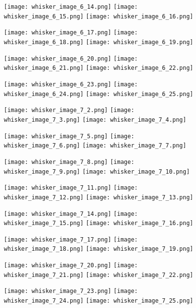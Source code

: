 \documentclass[12pt]{article}
\begin{document}
\begin{figure}
	\centerline{
		\texttt{[image: whisker\_image\_6\_14.png]}
		\texttt{[image: whisker\_image\_6\_15.png]}
		\texttt{[image: whisker\_image\_6\_16.png]}
	}
	\centerline{
		\texttt{[image: whisker\_image\_6\_17.png]}
		\texttt{[image: whisker\_image\_6\_18.png]}
		\texttt{[image: whisker\_image\_6\_19.png]}
	}
	\centerline{
		\texttt{[image: whisker\_image\_6\_20.png]}
		\texttt{[image: whisker\_image\_6\_21.png]}
		\texttt{[image: whisker\_image\_6\_22.png]}
	}
	\centerline{
		\texttt{[image: whisker\_image\_6\_23.png]}
		\texttt{[image: whisker\_image\_6\_24.png]}
		\texttt{[image: whisker\_image\_6\_25.png]}
	}
\end{figure}

\begin{figure}
	\centerline{
		\texttt{[image: whisker\_image\_7\_2.png]}
		\texttt{[image: whisker\_image\_7\_3.png]}
		\texttt{[image: whisker\_image\_7\_4.png]}
	}
	\centerline{
		\texttt{[image: whisker\_image\_7\_5.png]}
		\texttt{[image: whisker\_image\_7\_6.png]}
		\texttt{[image: whisker\_image\_7\_7.png]}
	}
	\centerline{
		\texttt{[image: whisker\_image\_7\_8.png]}
		\texttt{[image: whisker\_image\_7\_9.png]}
		\texttt{[image: whisker\_image\_7\_10.png]}
	}
	\centerline{
		\texttt{[image: whisker\_image\_7\_11.png]}
		\texttt{[image: whisker\_image\_7\_12.png]}
		\texttt{[image: whisker\_image\_7\_13.png]}
	}
\end{figure}

\begin{figure}
	\centerline{
		\texttt{[image: whisker\_image\_7\_14.png]}
		\texttt{[image: whisker\_image\_7\_15.png]}
		\texttt{[image: whisker\_image\_7\_16.png]}
	}
	\centerline{
		\texttt{[image: whisker\_image\_7\_17.png]}
		\texttt{[image: whisker\_image\_7\_18.png]}
		\texttt{[image: whisker\_image\_7\_19.png]}
	}
	\centerline{
		\texttt{[image: whisker\_image\_7\_20.png]}
		\texttt{[image: whisker\_image\_7\_21.png]}
		\texttt{[image: whisker\_image\_7\_22.png]}
	}
	\centerline{
		\texttt{[image: whisker\_image\_7\_23.png]}
		\texttt{[image: whisker\_image\_7\_24.png]}
		\texttt{[image: whisker\_image\_7\_25.png]}
	}
\end{figure}
\end{document}

